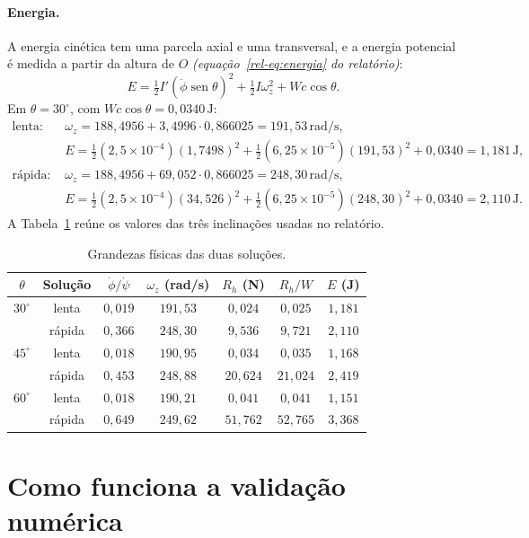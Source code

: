 \documentclass[11pt,a4paper]{article}
\newcommand{\seno}{\operatorname{sen}}
\newcommand{\un}[1]{\,\mathrm{#1}}
\newcommand{\phid}{\dot{\phi}}
\newcommand{\psid}{\dot{\psi}}
\newcommand{\rel}[1]{\textit{(equação~\ref*{rel-eq:#1} do relatório)}}
\begin{document}
\paragraph{Energia.} A energia cinética tem uma parcela axial e uma transversal, e a energia potencial é medida a partir da altura de $O$ \rel{energia}:
\begin{equation}
E=\tfrac{1}{2}I'\left(\phid\seno\theta\right)^2+\tfrac{1}{2}I\omega_z^2+Wc\cos\theta.
\end{equation}
Em $\theta=30^\circ$, com $Wc\cos\theta=0,0340\un{J}$:
\begin{align}
\text{lenta: }&\omega_z=188,4956+3,4996\cdot0,866025=191,53\un{rad/s},\nonumber\\
&E=\tfrac{1}{2}(2,5\times10^{-4})(1,7498)^2+\tfrac{1}{2}(6,25\times10^{-5})(191,53)^2+0,0340=1,181\un{J},\\
\text{rápida: }&\omega_z=188,4956+69,052\cdot0,866025=248,30\un{rad/s},\nonumber\\
&E=\tfrac{1}{2}(2,5\times10^{-4})(34,526)^2+\tfrac{1}{2}(6,25\times10^{-5})(248,30)^2+0,0340=2,110\un{J}.
\end{align}
A Tabela~\ref{m:tab:fis} reúne os valores das três inclinações usadas no relatório.

\begin{table}[H]
\centering\small
\caption{Grandezas físicas das duas soluções.}
\label{m:tab:fis}
\begin{tabular}{ccccccc}
\toprule
$\theta$ & Solução & $\phid/\psid$ & $\omega_z$ (rad/s) & $R_h$ (N) & $R_h/W$ & $E$ (J)\\
\midrule
$30^\circ$ & lenta & $0,019$ & $191,53$ & $0,024$ & $0,025$ & $1,181$\\
 & rápida & $0,366$ & $248,30$ & $9,536$ & $9,721$ & $2,110$\\
$45^\circ$ & lenta & $0,018$ & $190,95$ & $0,034$ & $0,035$ & $1,168$\\
 & rápida & $0,453$ & $248,88$ & $20,624$ & $21,024$ & $2,419$\\
$60^\circ$ & lenta & $0,018$ & $190,21$ & $0,041$ & $0,041$ & $1,151$\\
 & rápida & $0,649$ & $249,62$ & $51,762$ & $52,765$ & $3,368$\\
\bottomrule
\end{tabular}
\end{table}

\section{Como funciona a validação numérica}
\end{document}
